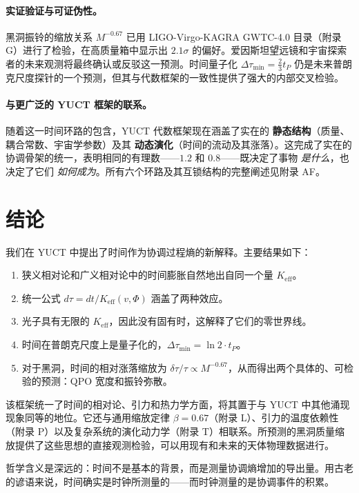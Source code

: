 \documentclass[12pt,a4paper]{article}
\newcommand{\Keff}{K_{\mathrm{eff}}}
\begin{document}
	\paragraph{实证验证与可证伪性。}
	黑洞振铃的缩放关系 \(M^{-0.67}\) 已用 LIGO-Virgo-KAGRA GWTC-4.0 目录（附录 G）进行了检验，在高质量箱中显示出 \(2.1\sigma\) 的偏好。爱因斯坦望远镜和宇宙探索者的未来观测将最终确认或反驳这一预测。时间量子化 \(\Delta \tau_{\min} = \frac{2}{3} t_P\) 仍是未来普朗克尺度探针的一个预测，但其与代数框架的一致性提供了强大的内部交叉检验。
	
	\paragraph{与更广泛的 YUCT 框架的联系。}
	随着这一时间环路的包含，YUCT 代数框架现在涵盖了实在的 \textbf{静态结构}（质量、耦合常数、宇宙学参数）及其 \textbf{动态演化}（时间的流动及其涨落）。这完成了实在的协调骨架的统一，表明相同的有理数——\(1.2\) 和 \(0.8\)——既决定了事物 \emph{是什么}，也决定了它们 \emph{如何成为}。所有六个环路及其互锁结构的完整阐述见附录 AF。
	
	\section{结论}
	
	我们在 YUCT 中提出了时间作为协调过程熵的新解释。主要结果如下：
	\begin{enumerate}
		\item 狭义相对论和广义相对论中的时间膨胀自然地出自同一个量 \(\Keff\)。
		\item 统一公式 \(d\tau = dt/\Keff(v,\Phi)\) 涵盖了两种效应。
		\item 光子具有无限的 \(\Keff\)，因此没有固有时，这解释了它们的零世界线。
		\item 时间在普朗克尺度上是量子化的，\(\Delta \tau_{\min} = \ln 2 \cdot t_P\)。
		\item 对于黑洞，时间的相对涨落缩放为 \(\delta\tau/\tau \propto M^{-0.67}\)，从而得出两个具体的、可检验的预测：QPO 宽度和振铃弥散。
	\end{enumerate}
	
	该框架统一了时间的相对论、引力和热力学方面，将其置于与 YUCT 中其他涌现现象同等的地位。它还与通用缩放定律 \(\beta = 0.67\)（附录 L）、引力的温度依赖性（附录 P）以及复杂系统的演化动力学（附录 T）相联系。所预测的黑洞质量缩放提供了这些思想的直接观测检验，可以用现有和未来的天体物理数据进行。
	
	哲学含义是深远的：时间不是基本的背景，而是测量协调熵增加的导出量。用古老的谚语来说，时间确实是时钟所测量的——而时钟测量的是协调事件的积累。
	
\end{document}
